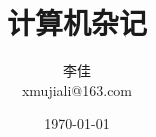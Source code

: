 \documentclass{ctexrep}[12pt,a4paper,openany]
\begin{document}
\title{\Huge 计算机杂记}
\author{李佳\\xmujiali@163.com}
\date{\today}
\maketitle
\tableofcontents







\end{document}

